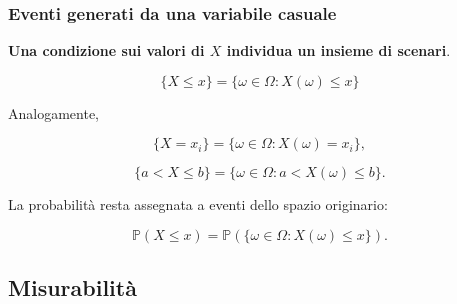 \documentclass[handout]{beamer}%
\providecommand{\Prob}{\mathbb{P}}
\providecommand{\1}{\mathbf{1}}
\providecommand{\QTR}[2]{\csname #1\endcsname{#2}}
\begin{document}
\begin{frame}%
%

\frametitle{Eventi generati da una variabile casuale}%


\textbf{Una condizione sui valori di $X$ individua un insieme di scenari}.%

\[
\{X\leq x\} = \{\omega\in\Omega:X(\omega)\leq x\}
\]


\medskip

Analogamente,%

\[
\{X=x_{i}\} = \{\omega\in\Omega:X(\omega)=x_{i}\},
\]
%

\[
\{a<X\leq b\} = \{\omega\in\Omega:a<X(\omega)\leq b\}.
\]


\medskip

La probabilit\`{a} resta assegnata a eventi dello spazio originario:%

\[
\Prob(X\leq x) = \Prob(\{\omega\in\Omega:X(\omega)\leq x\}).
\]
%

\transboxout
\end{frame}%




\subsection{Misurabilit\`{a}}%
\end{document}
